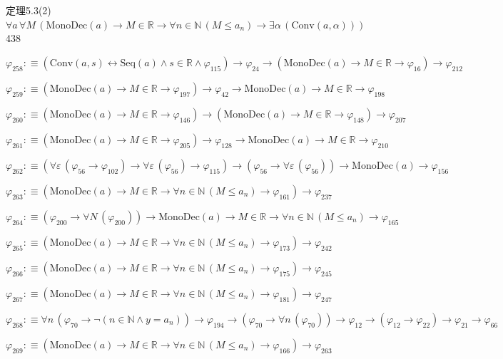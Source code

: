 \begin{fullproof}{定理5.3(2)}{$\forall a\,\forall M\,(\mathrm{MonoDec}(a) \to M \in \mathbb{R} \to \forall n \in \mathbb{N}\,(M \leq a_{n}) \to \exists \alpha\,(\mathrm{Conv}(a,\alpha)))$}{438}
\begin{abbrevlist}
\item $\varphi_{258} :\equiv (\mathrm{Conv}(a,s) \leftrightarrow \mathrm{Seq}(a) \land s \in \mathbb{R} \land \varphi_{115}) \to \varphi_{24} \to (\mathrm{MonoDec}(a) \to M \in \mathbb{R} \to \varphi_{16}) \to \varphi_{212}$
\item $\varphi_{259} :\equiv (\mathrm{MonoDec}(a) \to M \in \mathbb{R} \to \varphi_{197}) \to \varphi_{42} \to \mathrm{MonoDec}(a) \to M \in \mathbb{R} \to \varphi_{198}$
\item $\varphi_{260} :\equiv (\mathrm{MonoDec}(a) \to M \in \mathbb{R} \to \varphi_{146}) \to (\mathrm{MonoDec}(a) \to M \in \mathbb{R} \to \varphi_{148}) \to \varphi_{207}$
\item $\varphi_{261} :\equiv (\mathrm{MonoDec}(a) \to M \in \mathbb{R} \to \varphi_{205}) \to \varphi_{128} \to \mathrm{MonoDec}(a) \to M \in \mathbb{R} \to \varphi_{210}$
\item $\varphi_{262} :\equiv (\forall \varepsilon\,(\varphi_{56} \to \varphi_{102}) \to \forall \varepsilon\,(\varphi_{56}) \to \varphi_{115}) \to (\varphi_{56} \to \forall \varepsilon\,(\varphi_{56})) \to \mathrm{MonoDec}(a) \to \varphi_{156}$
\item $\varphi_{263} :\equiv (\mathrm{MonoDec}(a) \to M \in \mathbb{R} \to \forall n \in \mathbb{N}\,(M \leq a_{n}) \to \varphi_{161}) \to \varphi_{237}$
\item $\varphi_{264} :\equiv (\varphi_{200} \to \forall N\,(\varphi_{200})) \to \mathrm{MonoDec}(a) \to M \in \mathbb{R} \to \forall n \in \mathbb{N}\,(M \leq a_{n}) \to \varphi_{165}$
\item $\varphi_{265} :\equiv (\mathrm{MonoDec}(a) \to M \in \mathbb{R} \to \forall n \in \mathbb{N}\,(M \leq a_{n}) \to \varphi_{173}) \to \varphi_{242}$
\item $\varphi_{266} :\equiv (\mathrm{MonoDec}(a) \to M \in \mathbb{R} \to \forall n \in \mathbb{N}\,(M \leq a_{n}) \to \varphi_{175}) \to \varphi_{245}$
\item $\varphi_{267} :\equiv (\mathrm{MonoDec}(a) \to M \in \mathbb{R} \to \forall n \in \mathbb{N}\,(M \leq a_{n}) \to \varphi_{181}) \to \varphi_{247}$
\item $\varphi_{268} :\equiv \forall n\,(\varphi_{70} \to \neg (n \in \mathbb{N} \land y = a_{n})) \to \varphi_{194} \to (\varphi_{70} \to \forall n\,(\varphi_{70})) \to \varphi_{12} \to (\varphi_{12} \to \varphi_{22}) \to \varphi_{21} \to \varphi_{66}$
\item $\varphi_{269} :\equiv (\mathrm{MonoDec}(a) \to M \in \mathbb{R} \to \forall n \in \mathbb{N}\,(M \leq a_{n}) \to \varphi_{166}) \to \varphi_{263}$

\end{abbrevlist}
\end{fullproof}
